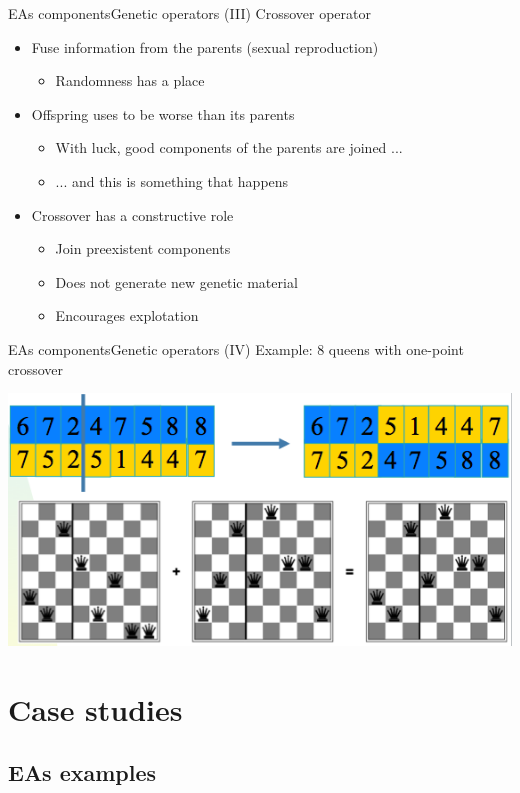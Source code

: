 \documentclass[10pt,compress]{beamer} %
\begin{document}
\begin{frame}{EAs components}{Genetic operators (III)} 
	Crossover operator
	\begin{itemize}
		\item Fuse information from the parents (sexual reproduction)
		\begin{itemize}
			\item Randomness has a place 
		\end{itemize}
		\item Offspring uses to be worse than its parents
		\begin{itemize}
			\item With luck, good components of the parents are joined ...
			\item ... and this is something that happens
		\end{itemize}
		\item Crossover has a constructive role
		\begin{itemize}
			\item Join preexistent components
			\item Does not generate new genetic material
			\item Encourages explotation
		\end{itemize}
	\end{itemize}
\end{frame}

\begin{frame}{EAs components}{Genetic operators (IV)} 
	Example: 8 queens with one-point crossover
	\begin{center}
		\includegraphics[width=0.7\linewidth]{figs/one-point.png}
	\end{center}
\end{frame}

\section{Case studies}

\subsection{EAs examples}
\end{document}
